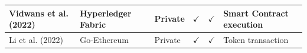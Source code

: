\documentclass[../access.tex]{subfiles}
\begin{document}
\begin{table}[htbp]
\begin{adjustwidth}{-1cm}{}
\begin{tabular}{m{4.4cm} >{\centering\arraybackslash}m{2.9cm} >{\centering\arraybackslash}m{1.0cm} >{\centering\arraybackslash}m{1.0cm} >{\centering\arraybackslash}m{1.5cm} >{\centering\arraybackslash}m{3.6cm}}
            \hline
            \footnotesize{Vidwans et al. (2022) \cite{Vidwans2022}}        & \footnotesize{Hyperledger Fabric}              & \footnotesize{Private}                           & $ \checkmark $                                         & $ \checkmark $                                        & \footnotesize{Smart Contract execution}    \\
            \hline
            \footnotesize{Li et al. (2022) \cite{Li2022}}                  & \footnotesize{Go-Ethereum}                     & \footnotesize{Private}                           & $ \checkmark $                                         & $ \checkmark $                                        & \footnotesize{Token transaction}           \\
            \bottomrule
        \end{tabular}
    \end{adjustwidth}
    \label{tbl:table7}
\end{table}
\end{document}
